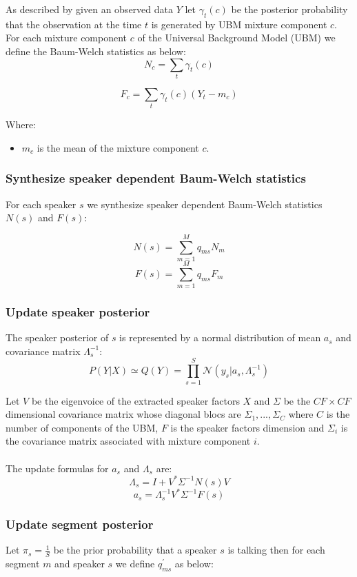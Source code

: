 \documentclass{techrep} %
\begin{document}
As described by \cite{BAUM} given an observed data $Y$ let
$\gamma_t(c)$ be the posterior probability that the observation at the
time $t$ is generated by UBM mixture component $c$.  For each mixture
component $c$ of the Universal Background Model (UBM) we define the
Baum-Welch statistics as below:
$$N_c = \sum_t{\gamma_t(c)}$$

$$F_c = \sum_t{\gamma_t(c)(Y_t - m_c)}$$

Where:
\begin{itemize}
\item $m_c$ is the mean of the mixture component $c$.
\end{itemize}
\subsubsection{Synthesize speaker dependent Baum-Welch statistics}

For each speaker $s$ we synthesize speaker dependent Baum-Welch statistics $N(s)$ and $F(s)$:

$$N(s) = \sum_{m=1}^{M}{q_{ms}N_m}$$
$$F(s) = \sum_{m=1}^{M}{q_{ms}F_m}$$

\subsubsection{Update speaker posterior}
The speaker posterior of $s$ is represented by a normal distribution
of mean $a_s$ and covariance matrix $\Lambda_s^{-1}$:
$$P(Y|X) \simeq Q(Y) = \prod_{s=1}^{S}\mathcal{N}(y_s|a_s,\Lambda_s^{-1})$$

Let $V$ be the eigenvoice of the extracted speaker factors $X$ and
$\Sigma$ be the $CF \times CF$ dimensional covariance matrix whose
diagonal blocs are $\Sigma_1, ..., \Sigma_C$ where $C$ is the number
of components of the UBM, $F$ is the speaker factors dimension and
$\Sigma_i$ is the covariance matrix associated with mixture component
$i$.\\\\ The update formulas for $a_s$ and $\Lambda_s$ are:
$$\Lambda_s = I + V^*\Sigma^{-1}N(s)V$$
$$a_s = \Lambda_s^{-1}V^*\Sigma^{-1}F(s)$$

\subsubsection{Update segment posterior}
Let $\pi_s = \frac{1}{S}$ be the prior probability that a speaker $s$
is talking then for each segment $m$ and speaker $s$ we define
$q_{ms}^{'}$ as below:
\end{document}
